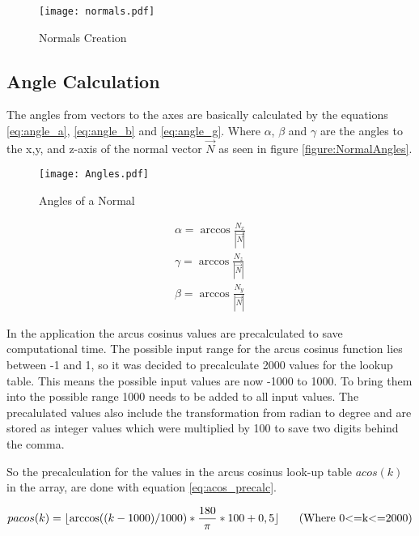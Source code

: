 \begin{figure}[H]
\begin{center}
  \texttt{[image: normals.pdf]}
  \caption{Normals Creation}
  \label{figure:normals}
\end{center}
\end{figure}

\subsection{Angle Calculation}

The angles from vectors to the axes are basically calculated by the equations \ref{eq:angle_a}, \ref{eq:angle_b} and
\vref{eq:angle_g}. Where $\alpha$, $\beta$ and $\gamma$ are the angles to the x,y, and z-axis 
of the normal vector $\vec{N}$ as seen in figure \vref{figure:NormalAngles}.

\begin{figure}[H]
\begin{center}
  \texttt{[image: Angles.pdf]}
  \caption{Angles of a Normal}
  \label{figure:NormalAngles}
\end{center} 
\end{figure}

\begin{align}
 \alpha = \arccos \frac{N_x}{\left|\vec{N}\right|}  
\label{eq:angle_a}\\
 \gamma = \arccos \frac{N_z}{\left|\vec{N}\right|}  
\label{eq:angle_b}\\
 \beta  = \arccos \frac{N_y}{\left|\vec{N}\right|}  
\label{eq:angle_g}
\end{align}


In the application the arcus cosinus values are precalculated to save computational time.
The possible input range for the arcus cosinus function lies between -1 and 1, so it was decided
to precalculate 2000 values for the lookup table. This means the possible input values are now
-1000 to 1000. To bring them into the possible range 1000 needs to be added to all input values.
The precalulated values also include the transformation from radian to degree and are stored as 
integer values which were multiplied by 100 to save two digits behind the comma.

So the precalculation for the values in the arcus cosinus look-up table $acos(k)$ 
in the array, are done with equation \vref{eq:acos_precalc}.

\begin{equation}
	pacos(k)=\lfloor \arccos ((k-1000)/1000) * \frac{180}{\pi}*100 + 0,5 \rfloor
	\mbox{\hspace{0.5cm} (Where 0<=k<=2000)}
	\label{eq:acos_precalc}
\end{equation}

